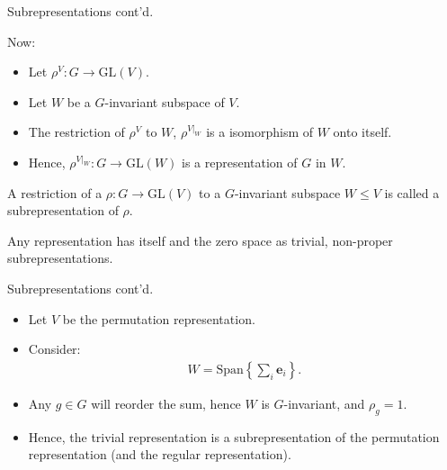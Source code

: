 \documentclass[handout, 10pt]{beamer}
\newcommand{\GL}{\text{GL}}
\newcommand{\bas}{\mathbf{e}}
\newcommand{\Span}{\text{Span}}
\begin{document}
	\begin{frame}{Subrepresentations cont'd.}
		\begin{block}{Now:}
			\begin{itemize}
				\item Let $\rho^V : G \rightarrow \GL(V)$.
				
				\item Let $W$ be a $G$-invariant subspace of $V$.
				
				\item The restriction of $\rho^V$ to $W$, $\rho^{V|_W}$ is a isomorphism of $W$ onto itself.
				
				\item Hence, $\rho^{V|_W}: G \rightarrow \GL(W)$ is a representation of $G$ in $W$.
			\end{itemize}
		\end{block}
		
		\begin{definition}[Subrepresentation]
			A restriction of a $\rho: G \rightarrow \GL(V)$ to a $G$-invariant subspace $W \leq V$ is called a subrepresentation of $\rho$.
		\end{definition}
		
		\begin{example}
			Any representation has itself and the zero space as trivial, non-proper subrepresentations.
		\end{example}
	\end{frame}
	
	\begin{frame}{Subrepresentations cont'd.}
		\begin{example}
			\begin{itemize}
				\item Let $V$ be the permutation representation. 
				
				\item Consider:
				\begin{align*}
					W = \Span\left\lbrace \sum_i \bas_i \right\rbrace.
				\end{align*}
				
				\item Any $g \in G$ will reorder the sum, hence $W$ is $G$-invariant, and $\rho_g = 1$.
				
				\item Hence, the trivial representation is a subrepresentation of the permutation representation (and the regular representation).
			\end{itemize}		
		\end{example}
	\end{frame}
	
\end{document}
